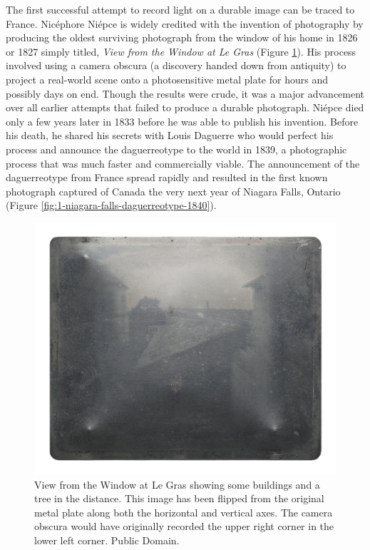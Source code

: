 \documentclass[
]{book}
\begin{document}
The first successful attempt to record light on a durable image can be traced to France. Nicéphore Niépce is widely credited with the invention of photography by producing the oldest surviving photograph from the window of his home in 1826 or 1827 simply titled, \emph{View from the Window at Le Gras} (Figure \ref{fig:1-View-from-the-Window-at-Le-Gras}). His process involved using a camera obscura (a discovery handed down from antiquity) to project a real-world scene onto a photosensitive metal plate for hours and possibly days on end. Though the results were crude, it was a major advancement over all earlier attempts that failed to produce a durable photograph. Niépce died only a few years later in 1833 before he was able to publish his invention. Before his death, he shared his secrets with Louis Daguerre who would perfect his process and announce the daguerreotype to the world in 1839, a photographic process that was much faster and commercially viable. The announcement of the daguerreotype from France spread rapidly and resulted in the first known photograph captured of Canada the very next year of Niagara Falls, Ontario (Figure \ref{fig:1-niagara-falls-daguerreotype-1840}).

\begin{figure}
\includegraphics[width=0.75\linewidth]{images/01-View-from-the-Window-at-Le-Gras} \caption{View from the Window at Le Gras showing some buildings and a tree in the distance. This image has been flipped from the original metal plate along both the horizontal and vertical axes. The camera obscura would have originally recorded the upper right corner in the lower left corner. Public Domain.}\label{fig:1-View-from-the-Window-at-Le-Gras}
\end{figure}
\end{document}
